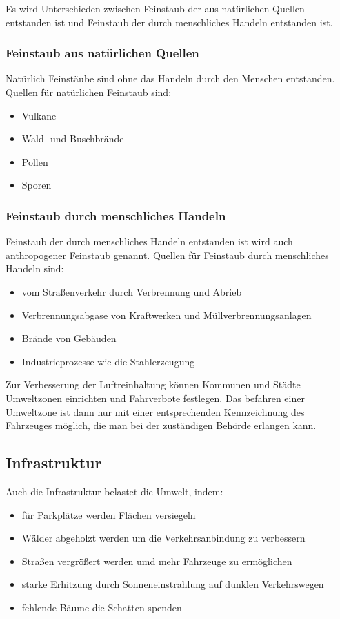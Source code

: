 Es wird Unterschieden zwischen Feinstaub der aus natürlichen Quellen entstanden ist und Feinstaub der durch menschliches Handeln entstanden ist.

\subsubsection{Feinstaub aus natürlichen Quellen}
Natürlich Feinstäube sind ohne das Handeln durch den Menschen entstanden.
Quellen für natürlichen Feinstaub sind:
\begin{itemize}
	\item Vulkane
	\item Wald- und Buschbrände
	\item Pollen
	\item Sporen
\end{itemize}


\subsubsection{Feinstaub durch menschliches Handeln}
Feinstaub der durch menschliches Handeln entstanden ist wird auch anthropogener Feinstaub genannt.
Quellen für Feinstaub durch menschliches Handeln sind:
\begin{itemize}
	\item vom Straßenverkehr durch Verbrennung und Abrieb
	\item Verbrennungsabgase von Kraftwerken und Müllverbrennungsanlagen
	\item Brände von Gebäuden
	\item Industrieprozesse wie die Stahlerzeugung
\end{itemize}

Zur Verbesserung der Luftreinhaltung können Kommunen und Städte Umweltzonen einrichten und Fahrverbote festlegen.
Das befahren einer Umweltzone ist dann nur mit einer entsprechenden Kennzeichnung des Fahrzeuges möglich, die man bei der zuständigen Behörde erlangen kann.




\subsection{Infrastruktur}
Auch die Infrastruktur belastet die Umwelt, indem:
\begin{itemize}
	\item für Parkplätze werden Flächen versiegeln
	\item Wälder abgeholzt werden um die Verkehrsanbindung zu verbessern
	\item Straßen vergrößert werden umd mehr Fahrzeuge zu ermöglichen
	\item starke Erhitzung durch Sonneneinstrahlung auf dunklen Verkehrswegen
	\item fehlende Bäume die Schatten spenden
\end{itemize}